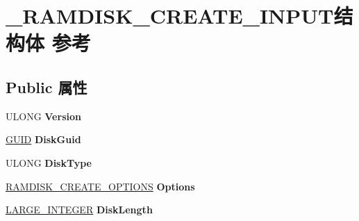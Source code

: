 \hypertarget{struct___r_a_m_d_i_s_k___c_r_e_a_t_e___i_n_p_u_t}{}\section{\+\_\+\+R\+A\+M\+D\+I\+S\+K\+\_\+\+C\+R\+E\+A\+T\+E\+\_\+\+I\+N\+P\+U\+T结构体 参考}
\label{struct___r_a_m_d_i_s_k___c_r_e_a_t_e___i_n_p_u_t}
\subsection*{Public 属性}
\begin{DoxyCompactItemize}
\item 
\mbox{\label{struct___r_a_m_d_i_s_k___c_r_e_a_t_e___i_n_p_u_t_afefa7a47e1e58365d3d638fe324d19e0}} 
U\+L\+O\+NG {\bfseries Version}
\item 
\mbox{\label{struct___r_a_m_d_i_s_k___c_r_e_a_t_e___i_n_p_u_t_a963416bac4f69260b286877a8a7b549a}} 
\hyperlink{interface_g_u_i_d}{G\+U\+ID} {\bfseries Disk\+Guid}
\item 
\mbox{\label{struct___r_a_m_d_i_s_k___c_r_e_a_t_e___i_n_p_u_t_af66e7e9cc84b98e7dca00a6afe90764b}} 
U\+L\+O\+NG {\bfseries Disk\+Type}
\item 
\mbox{\label{struct___r_a_m_d_i_s_k___c_r_e_a_t_e___i_n_p_u_t_a3f4eaaffae6b6b0935e7d78fcc266c50}} 
\hyperlink{struct___r_a_m_d_i_s_k___c_r_e_a_t_e___o_p_t_i_o_n_s}{R\+A\+M\+D\+I\+S\+K\+\_\+\+C\+R\+E\+A\+T\+E\+\_\+\+O\+P\+T\+I\+O\+NS} {\bfseries Options}
\item 
\mbox{\label{struct___r_a_m_d_i_s_k___c_r_e_a_t_e___i_n_p_u_t_a7a9e32ae97cbeae88e3ff04985f16603}} 
\hyperlink{union___l_a_r_g_e___i_n_t_e_g_e_r}{L\+A\+R\+G\+E\+\_\+\+I\+N\+T\+E\+G\+ER} {\bfseries Disk\+Length}
\item 
\mbox{\label{struct___r_a_m_d_i_s_k___c_r_e_a_t_e___i_n_p_u_t_accfb28b105ca44cd73a9edde430461dd}} 

\end{DoxyCompactItemize}
